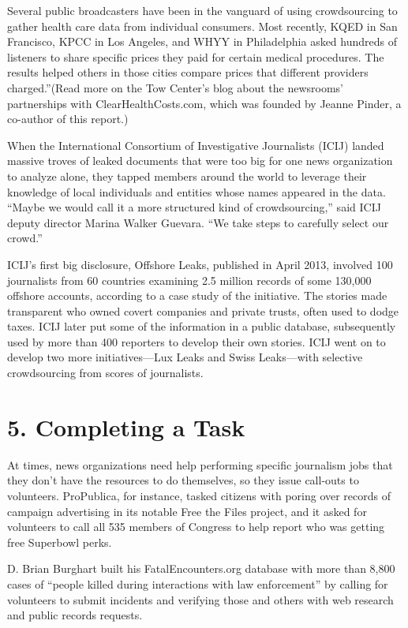\begin{itemize}
\begin{itemize}
\begin{enumerate}
{Several public broadcasters have been in the vanguard of using crowdsourcing to gather health care data from individual consumers. Most recently, KQED in San Francisco, KPCC in Los Angeles, and WHYY in Philadelphia asked hundreds of listeners to share specific prices they paid for certain medical procedures. The results helped others in those cities compare prices that different providers charged.”\autocite{CHC}(Read more on the Tow Center’s blog about the newsrooms’ partnerships with ClearHealthCosts.com, which was founded by Jeanne Pinder, a co-author of this report.\autocite{Towblog})

When the International Consortium of Investigative Journalists (ICIJ) landed massive troves of leaked documents that were too big for one news organization to analyze alone, they tapped members around the world to leverage their knowledge of local individuals and entities whose names appeared in the data. “Maybe we would call it a more structured kind of crowdsourcing,” said ICIJ deputy director Marina Walker Guevara. “We take steps to carefully select our crowd.”\autocite{ICIJ}

ICIJ’s first big disclosure, Offshore Leaks, published in April 2013, involved 100 journalists from 60 countries examining 2.5 million records of some 130,000 offshore accounts, according to a case study of the initiative.\autocite{Buzenberg} The stories made transparent who owned covert companies and private trusts, often used to dodge taxes. ICIJ later put some of the information in a public database, subsequently used by more than 400 reporters to develop their own stories.\autocite{ICIJ} ICIJ went on to develop two more initiatives---Lux Leaks and Swiss Leaks---with selective crowdsourcing from scores of journalists.\autocite{Buzenberg} 


\section{5. Completing a Task}

At times, news organizations need help performing specific journalism jobs that they don’t have the resources to do themselves, so they issue call-outs to volunteers. ProPublica, for instance, tasked citizens with poring over records of campaign advertising in its notable Free the Files project, and it asked for volunteers to call all 535 members of Congress to help report who was getting free Superbowl perks.\autocite{perks}

D. Brian Burghart built his FatalEncounters.org database with more than 8,800 cases of “people killed during interactions with law enforcement” by calling for volunteers to submit incidents and verifying those and others with web research and public records requests.\autocite{Burghart}

}
\end{enumerate}
\end{itemize}
\end{itemize}
